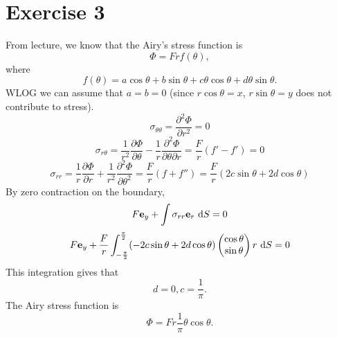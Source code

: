 \documentclass[12pt]{article}
\newcommand{\ee}{{\bf e}}
\newcommand{\pr}{{\partial}}
\newcommand{\mx}[1]{\begin{pmatrix}#1\end{pmatrix}}
\newcommand{\dx}[1]{\text{ d}#1}
\begin{document}
\section{Exercise 3}
From lecture, we know that the Airy's stress function is
\[
\Phi = Frf(\theta),
\]
where
\[
f(\theta) = a\cos\theta + b\sin\theta + c\theta\cos\theta + d\theta\sin\theta.
\]
WLOG we can assume that $a = b = 0$ (since $r\cos\theta = x$, $r\sin\theta = y$ does not contribute to stress).
\[
\sigma_{\theta\theta} = \frac{\pr^2 \Phi}{\pr r^2} =0
\]
\[
\sigma_{r\theta} = \frac {1}{ r^2} \frac{\pr \Phi}{\pr \theta} -\frac{1}{r} \frac{\pr^2 \Phi}{\pr \theta\pr r} = \frac{F}{r}(f' - f')=0
\]
\[
\sigma_{rr} = \frac 1 r \frac{\pr \Phi}{\pr r} +\frac{1}{r^2} \frac{\pr^2 \Phi}{\pr \theta^2} =\frac{F}{r}(f+f'')  = \frac F r(2c\sin\theta + 2d\cos\theta)
\]
By zero contraction on the boundary,
\[
F\ee_y +\int\sigma_{rr}\ee_r \dx{S} = 0
\]
\[
F\ee_y +\frac F r\int_{-\frac \pi 2}^{\frac \pi 2}(-2c\sin\theta + 2d\cos\theta)\mx{\cos\theta \\ \sin\theta} r\dx{S} = 0
\]
This integration gives that
\[
d=0, c = \frac 1 \pi.
\]
The Airy stress function is
\[
\Phi = Fr\frac 1 \pi \theta\cos\theta.
\]
\end{document}
